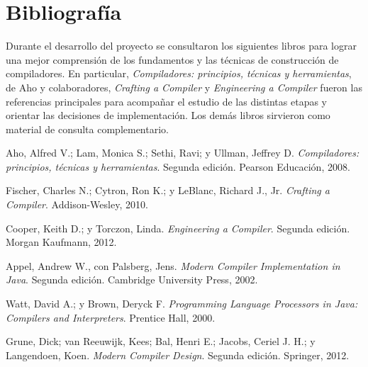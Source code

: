 \chapter*{Bibliografía}
{}
\label{cap:bibliografia}

Durante el desarrollo del proyecto se consultaron los siguientes libros
para lograr una mejor comprensión de los fundamentos y las técnicas de
construcción de compiladores. En particular, \emph{Compiladores:
principios, técnicas y herramientas}, de Aho y colaboradores,
\emph{Crafting a Compiler} y \emph{Engineering a Compiler} fueron las
referencias principales para acompañar el estudio de las distintas
etapas y orientar las decisiones de implementación. Los demás libros
sirvieron como material de consulta complementario.

\begin{enumerate}[leftmargin=*,label={[\arabic*]}]
  \item Aho, Alfred V.; Lam, Monica S.; Sethi, Ravi; y Ullman, Jeffrey D.
  \emph{Compiladores: principios, técnicas y herramientas}.
  Segunda edición. Pearson Educación, 2008.

  \item Fischer, Charles N.; Cytron, Ron K.; y LeBlanc, Richard J., Jr.
  \emph{Crafting a Compiler}. Addison-Wesley, 2010.

  \item Cooper, Keith D.; y Torczon, Linda.
  \emph{Engineering a Compiler}. Segunda edición. Morgan Kaufmann, 2012.

  \item Appel, Andrew W., con Palsberg, Jens.
  \emph{Modern Compiler Implementation in Java}.
  Segunda edición. Cambridge University Press, 2002.

  \item Watt, David A.; y Brown, Deryck F.
  \emph{Programming Language Processors in Java: Compilers and Interpreters}.
  Prentice Hall, 2000.

  \item Grune, Dick; van Reeuwijk, Kees; Bal, Henri E.; Jacobs, Ceriel J. H.;
  y Langendoen, Koen. \emph{Modern Compiler Design}.
  Segunda edición. Springer, 2012.
\end{enumerate}
